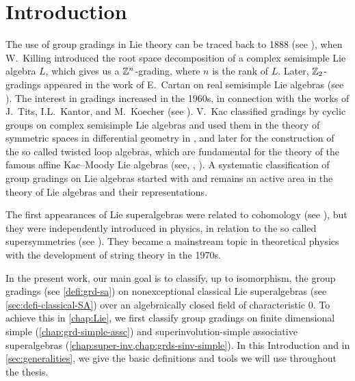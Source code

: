 \chapter*{Introduction}\label{chap:intro}

The use of group gradings in Lie theory can be traced back to 1888 (see \cite{MR1510529}), when W.~Killing introduced the root space decomposition of a complex semisimple Lie algebra $L$, which gives us a $\mathbb{Z}^n$-grading, where $n$ is the rank of $L$.  
Later, $\mathbb{Z}_2$-gradings appeared in the work of E.~Cartan on real semisimple Lie algebras (see \cite{Cartan-1914}). 
The interest in gradings increased in the 1960s, in connection with the works of J.~Tits, I.L.~Kantor, and M.~Koecher (see \cite{Tit62,Kan64,Koe67}). 
V.~Kac classified gradings by cyclic groups on complex semisimple Lie algebras and used them in the theory of symmetric spaces in differential geometry in \cite{Kac68}, and later for the construction of the so called twisted loop algebras, which are fundamental for the theory of the famous affine Kac--Moody Lie algebras (see, \eg, \cite{Kac90}). 
A systematic classification of group gradings on Lie algebras started with \cite{PZ} and remains an active area in the theory of Lie algebras and their representations.

The first appearances of Lie superalgebras were related to cohomology (see \cite{FN56,Gen63,Gen64,MM65}), but they were independently introduced in physics, in relation to the so called supersymmetries (see \cite{GN64,Miy68,Mic69}). 
They became a mainstream topic in theoretical physics with the development of string theory in the 1970s. 

In the present work, our main goal is to classify, up to isomorphism, the group gradings (see \cref{defi:grd-sa}) on nonexceptional classical Lie superalgebras (see \cref{sec:defi-classical-SA}) over an algebraically closed field of characteristic $0$.  
To achieve this in \cref{chap:Lie}, we first classify group gradings on finite dimensional simple (\cref{chap:grd-simple-assc}) and superinvolution-simple associative superalgebras (\cref{chap:super-inv,chap:grds-sinv-simple}). 
In this Introduction and in \cref{sec:generalities}, we give the basic definitions and tools we will use throughout the thesis. 





